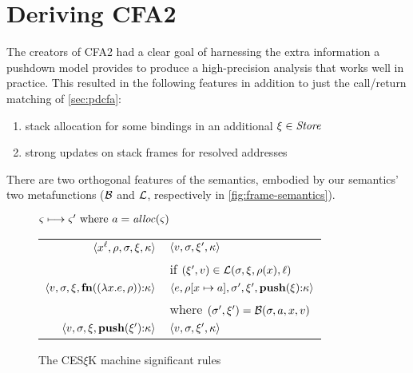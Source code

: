 \section{Deriving CFA2}
\label{sec:cfa2}

The creators of CFA2 had a clear goal of harnessing the extra information a pushdown model provides to produce a high-precision analysis that works well in practice.
%
This resulted in the following features in addition to just the call/return matching of \autoref{sec:pdcfa}:
%

\begin{enumerate}
\item{stack allocation for some bindings in an additional $\mframe \in \Store$}
\item{strong updates on stack frames for resolved addresses}
\end{enumerate}
There are two orthogonal features of the semantics, embodied by our semantics' two metafunctions ($\bind$ and $\lookup$, respectively in \autoref{fig:frame-semantics}).

\begin{figure}
  \centering
  $\mstate \stepto \mstate' \text{ where } \maddr = \alloc(\mstate)$ \\
  \begin{tabular}{r|l}
    \hline
    $\tpl{\svar[\mlab]{\mvar}, \menv, \mstore, \mframe, \mkont}$
    &
    $\tpl{\mval,\mstore,\mframe',\mkont}$
    \\ & if $(\mframe', \mval) \in \lookup(\mstore,\mframe,\menv(\mvar),\mlab)$
    \\
    $\tpl{\mval,\mstore,\mframe,\kcons{\kfn{\vclo{\slam{\mvar}{\mexpr}}{\menv}}}{\mkont}}$
    &
    $\tpl{\mexpr, \extm{\menv}{\mvar}{\maddr}, \mstore', \mframe', \kcons{\kpush{\mframe}}{\mkont}}$
    \\ & where $(\mstore',\mframe') = \bind(\mstore,\maddr,\mvar,\mval)$
    \\
    $\tpl{\mval,\mstore,\mframe,\kcons{\kpush{\mframe'}}{\mkont}}$
    &
    $\tpl{\mval,\mstore,\mframe',\mkont}$
  \end{tabular}
  \caption{The CES$\xi$K machine significant rules}
  \label{fig:frame-semantics}
\end{figure}

